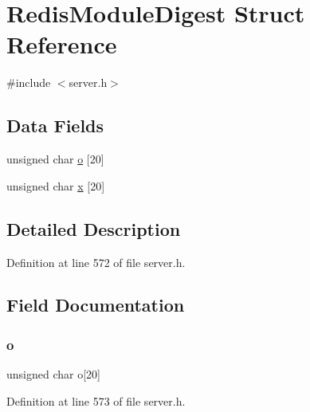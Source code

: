 \hypertarget{struct_redis_module_digest}{}\section{Redis\+Module\+Digest Struct Reference}
\label{struct_redis_module_digest}


{\ttfamily \#include $<$server.\+h$>$}

\subsection*{Data Fields}
\begin{DoxyCompactItemize}
\item 
unsigned char \hyperlink{struct_redis_module_digest_ad0bba53c501b274898d0429d9ccc5b68}{o} \mbox{[}20\mbox{]}
\item 
unsigned char \hyperlink{struct_redis_module_digest_a1ef32d657472ca4a7310141aa4f488b5}{x} \mbox{[}20\mbox{]}
\end{DoxyCompactItemize}


\subsection{Detailed Description}


Definition at line 572 of file server.\+h.



\subsection{Field Documentation}
\mbox{\label{struct_redis_module_digest_ad0bba53c501b274898d0429d9ccc5b68}} 
\subsubsection{\texorpdfstring{o}{o}}
{\footnotesize\ttfamily unsigned char o\mbox{[}20\mbox{]}}



Definition at line 573 of file server.\+h.

\mbox{\label{struct_redis_module_digest_a1ef32d657472ca4a7310141aa4f488b5}} 
